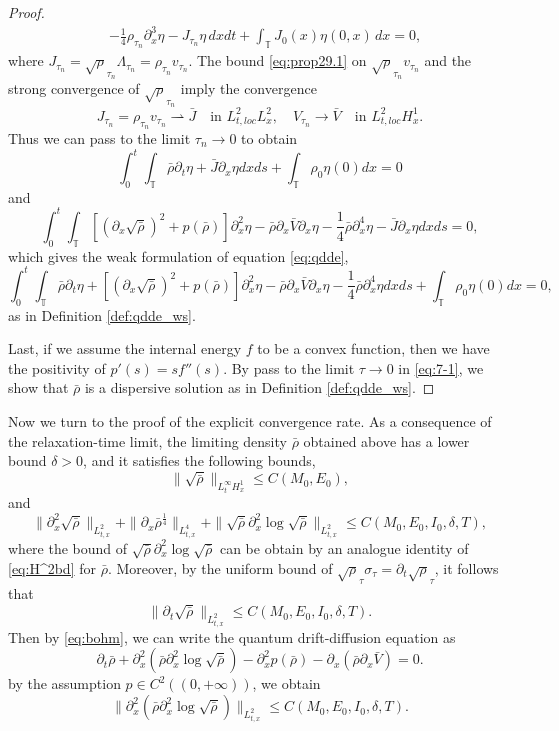 \documentclass[leqno]{amsart}
\theoremstyle{plain}
\theoremstyle{definition}
\theoremstyle{remark}
\theoremstyle{plain}
\theoremstyle{plain}
\def\T{{\mathbb T}}%
\def\d{{\partial}}
\numberwithin{equation}{section}
\begin{document}
\begin{proof}
\begin{align*}
&-\frac{1}{4}\rho_{\tau_n}\d_x^3\eta-J_{\tau_n}\eta\,dxdt+\int_{\T}J_0(x)\eta(0, x)\,dx=0,
\end{align*}
where $J_{\tau_n}=\sqrt\rho_{\tau_n}\Lambda_{\tau_n}=\rho_{\tau_n} v_{\tau_n}$. 
The bound \eqref{eq:prop29.1} on $\sqrt\rho_{\tau_n}v_{\tau_n}$ and the strong convergence of $\sqrt\rho_{\tau_n}$ imply the convergence 
\[
J_{\tau_n}=\rho_{\tau_n} v_{\tau_n}\rightharpoonup \bar J\quad \textrm{in }L^2_{t,loc}L^2_x,\quad V_{\tau_n}\to\bar V\quad \textrm{in }L^2_{t,loc}H^1_x.
\]
Thus we can pass to the limit ${\tau_n}\to 0$ to obtain
\[
\int_0^t\int_\T\bar\rho\d_t\eta+\bar J\d_x\eta dxds+\int_\T \rho_0\eta(0)dx=0
\]
and
\[
\int_0^t\int_\T [(\d_x\sqrt{\bar\rho})^2+p(\bar\rho)]\d_x^2\eta-\bar\rho\d_x\bar V\d_x\eta-\frac14\bar\rho\d_x^4\eta-\bar J\d_x\eta dxds=0,
\]
which gives the weak formulation of equation \eqref{eq:qdde},
\[
\int_0^t\int_\T\bar\rho\d_t\eta+[(\d_x\sqrt{\bar\rho})^2+p(\bar\rho)]\d_x^2\eta-\bar\rho\d_x\bar V\d_x\eta-\frac14\bar\rho\d_x^4\eta dxds+\int_\T \rho_0\eta(0)dx=0,
\]
as in Definition \ref{def:qdde_ws}.

Last, if we assume the internal energy $f$ to be a convex function, then we have the positivity of $p'(s)=s f''(s)$. By pass to the limit $\tau\to 0$ in \eqref{eq:7-1}, we show that $\bar\rho$ is a dispersive solution as in Definition \ref{def:qdde_ws}.
\end{proof}

Now we turn to the proof of the explicit convergence rate. As a consequence of the relaxation-time limit, the limiting density $\bar\rho$ obtained above has a lower bound $\delta>0$, and it satisfies the following bounds,
\begin{equation}\label{eq:bd_barrho_1}
\|\sqrt{\bar\rho}\|_{L^\infty_tH^1_x}\leq C(M_0,E_0),
\end{equation}
and
\begin{equation}\label{eq:bd_barrho_2}
\|\d_x^2\sqrt{\bar\rho}\|_{L^2_{t,x}}+\|\d_x\bar\rho^\frac14\|_{L^4_{t,x}}+\|\sqrt{\bar\rho}\d_x^2\log\sqrt{\bar\rho}\|_{L^2_{t,x}}\leq C(M_0,E_0,I_0,\delta,T),
\end{equation}
where the bound of $\sqrt{\bar\rho}\d_x^2\log\sqrt{\bar\rho}$ can be obtain by an analogue identity of \eqref{eq:H^2bd} for $\bar\rho$. 
Moreover, by the uniform bound of $\sqrt\rho_\tau\sigma_\tau=\d_t\sqrt\rho_\tau$, it follows that
\begin{equation}\label{eq:bd_barrho_3}
\|\d_t\sqrt{\bar\rho}\|_{L^2_{t,x}}\leq C(M_0,E_0,I_0,\delta,T).
\end{equation}
Then by \eqref{eq:bohm}, we can write the quantum drift-diffusion equation as
\[
\d_t\bar\rho+\d_x^2(\bar\rho\d_x^2\log\sqrt{\bar\rho})-\d_x^2 p(\bar\rho)-\d_x(\bar\rho\d_x\bar V)=0.
\]
by the assumption $p\in C^2((0,+\infty))$, we obtain
\begin{equation}\label{eq:bd_barrho_4}
\|\d_x^2(\bar\rho\d_x^2\log\sqrt{\bar\rho})\|_{L^2_{t,x}}\leq C(M_0,E_0,I_0,\delta,T).
\end{equation}
\end{document}

